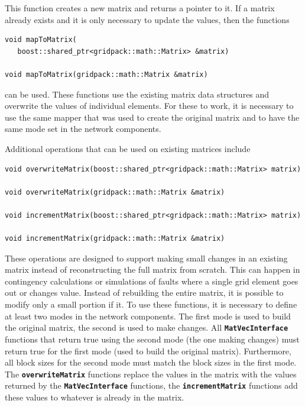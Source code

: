 This function creates a new matrix and returns a pointer to it. If a matrix already exists and it is only necessary to update the values, then the functions

{
\color{red}
\begin{Verbatim}[fontseries=b]
void mapToMatrix(
   boost::shared_ptr<gridpack::math::Matrix> &matrix)

void mapToMatrix(gridpack::math::Matrix &matrix)
\end{Verbatim}
}

can be used. These functions use the existing matrix data structures and overwrite the values of individual elements. For these to work, it is necessary to use the same mapper that was used to create the original matrix and to have the same mode set in the network components.

Additional operations that can be used on existing matrices include

{
\color{red}
\begin{Verbatim}[fontseries=b]
void overwriteMatrix(boost::shared_ptr<gridpack::math::Matrix> matrix)

void overwriteMatrix(gridpack::math::Matrix &matrix)

void incrementMatrix(boost::shared_ptr<gridpack::math::Matrix> matrix)

void incrementMatrix(gridpack::math::Matrix &matrix)
\end{Verbatim}
}

These operations are designed to support making small changes in an existing matrix instead of reconstructing the full matrix from scratch. This can happen in contingency calculations or simulations of faults where a single grid element goes out or changes value. Instead of rebuilding the entire matrix, it is possible to modify only a small portion if it. To use these functions, it is necessary to define at least two modes in the network components. The first mode is used to build the original matrix, the second is used to make changes. All \texttt{\textbf{MatVecInterface}} functions that return true using the second mode (the one making changes) must return true for the first mode (used to build the original matrix). Furthermore, all block sizes for the second mode must match the block sizes in the first mode. The \texttt{\textbf{overwriteMatrix}} functions replace the values in the matrix with the values returned by the \texttt{\textbf{MatVecInterface}} functions, the \texttt{\textbf{incrementMatrix}} functions add these values to whatever is already in the matrix.

